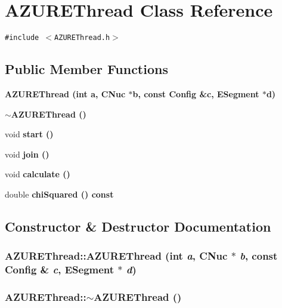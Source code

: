 \section{AZUREThread Class Reference}
\label{classAZUREThread}
{\tt \#include $<$AZUREThread.h$>$}

\subsection*{Public Member Functions}
\begin{CompactItemize}
\item 
\bf{AZUREThread} (int a, \bf{CNuc} $\ast$b, const \bf{Config} \&c, \bf{ESegment} $\ast$d)
\item 
\bf{$\sim$AZUREThread} ()
\item 
void \bf{start} ()
\item 
void \bf{join} ()
\item 
void \bf{calculate} ()
\item 
double \bf{chi\-Squared} () const 
\end{CompactItemize}


\subsection{Constructor \& Destructor Documentation}
\subsubsection{\setlength{\rightskip}{0pt plus 5cm}AZUREThread::AZUREThread (int {\em a}, \bf{CNuc} $\ast$ {\em b}, const \bf{Config} \& {\em c}, \bf{ESegment} $\ast$ {\em d})\hspace{0.3cm}{\tt  [inline]}}\label{classAZUREThread_d2aef83bca1243b140cd961b83116217}


\subsubsection{\setlength{\rightskip}{0pt plus 5cm}AZUREThread::$\sim$AZUREThread ()\hspace{0.3cm}{\tt  [inline]}}\label{classAZUREThread_8b94ea589a6f2e187f549b55abc2e380}




